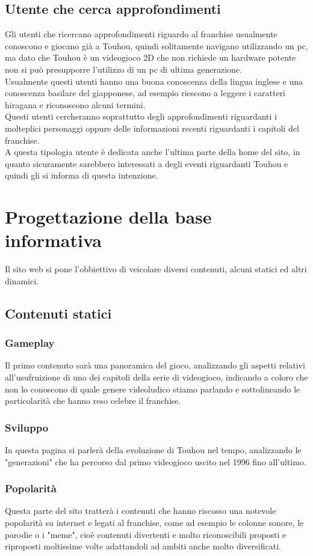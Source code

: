 \documentclass[openany, a4paper, 12pt]{report}
\begin{document}
		\subsection{Utente che cerca approfondimenti}
		Gli utenti che ricercano approfondimenti riguardo al franchise usualmente conoscono e giocano già a Touhou, quindi solitamente navigano utilizzando un pc, ma dato che Touhou è un videogioco 2D che non richiede un hardware potente non si può presupporre l'utilizzo di un pc di ultima generazione.\\
		Usualmente questi utenti hanno una buona conoscenza della lingua inglese e una conoscenza basilare del giapponese, ad esempio riescono a leggere i caratteri hiragana e riconoscono alcuni termini.\\
		Questi utenti cercheranno soprattutto degli approfondimenti riguardanti i molteplici personaggi oppure delle informazioni recenti riguardanti i capitoli del franchise.\\
		A questa tipologia utente è dedicata anche l'ultima parte della home del sito, in quanto sicuramente sarebbero interessati a degli eventi riguardanti Touhou e quindi gli si informa di questa intenzione.
	
	\section{Progettazione della base informativa}
		Il sito web si pone l'obbiettivo di veicolare diversi contenuti, alcuni statici ed altri dinamici.
	\subsection{Contenuti statici}
		\subsubsection{Gameplay}
		Il primo contenuto sarà una panoramica del gioco, analizzando gli aspetti relativi all'usufruizione di uno dei capitoli della serie di videogioco, indicando a coloro che non lo conoscono di quale genere videoludico stiamo parlando e sottolineando le particolarità che hanno reso celebre il franchise.
		\subsubsection{Sviluppo}
		In questa pagina si parlerà della evoluzione di Touhou nel tempo, analizzando le "generazioni" che ha percorso dal primo videogioco uscito nel 1996 fino all'ultimo.
		\subsubsection{Popolarità}
		Questa parte del sito tratterà i contenuti che hanno riscosso una notevole popolarità su internet e legati al franchise, come ad esempio le colonne sonore, le parodie o i "meme", cioè contenuti divertenti e molto riconoscibili proposti e riproposti moltissime volte adattandoli ad ambiti anche molto diversificati.
\end{document}
